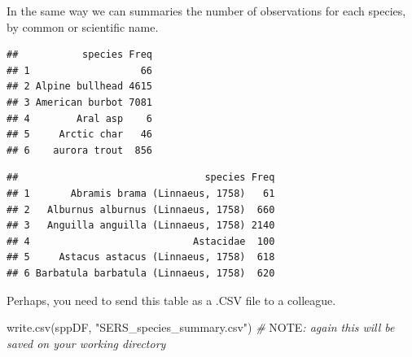 \documentclass[
  10pt,
]{article}
\newenvironment{Shaded}{\begin{snugshade}}{\end{snugshade}}
\newcommand{\AlertTok}[1]{\textcolor[rgb]{0.94,0.16,0.16}{#1}}
\newcommand{\CommentTok}[1]{\textcolor[rgb]{0.56,0.35,0.01}{\textit{#1}}}
\newcommand{\DecValTok}[1]{\textcolor[rgb]{0.00,0.00,0.81}{#1}}
\newcommand{\FunctionTok}[1]{\textcolor[rgb]{0.00,0.00,0.00}{#1}}
\newcommand{\NormalTok}[1]{#1}
\newcommand{\OtherTok}[1]{\textcolor[rgb]{0.56,0.35,0.01}{#1}}
\newcommand{\SpecialCharTok}[1]{\textcolor[rgb]{0.00,0.00,0.00}{#1}}
\newcommand{\StringTok}[1]{\textcolor[rgb]{0.31,0.60,0.02}{#1}}
\begin{document}
In the same way we can summaries the number of observations for each species, by common or scientific name.

\begin{Shaded}
\end{Shaded}

\begin{verbatim}
##           species Freq
## 1                   66
## 2 Alpine bullhead 4615
## 3 American burbot 7081
## 4        Aral asp    6
## 5     Arctic char   46
## 6    aurora trout  856
\end{verbatim}

\begin{Shaded}
\end{Shaded}

\begin{verbatim}
##                                species Freq
## 1       Abramis brama (Linnaeus, 1758)   61
## 2   Alburnus alburnus (Linnaeus, 1758)  660
## 3   Anguilla anguilla (Linnaeus, 1758) 2140
## 4                            Astacidae  100
## 5     Astacus astacus (Linnaeus, 1758)  618
## 6 Barbatula barbatula (Linnaeus, 1758)  620
\end{verbatim}

Perhaps, you need to send this table as a .CSV file to a colleague.

\begin{Shaded}
\begin{Highlighting}[]
\FunctionTok{write.csv}\NormalTok{(sppDF, }\StringTok{"SERS\_species\_summary.csv"}\NormalTok{)}
\CommentTok{\# }\AlertTok{NOTE}\CommentTok{: again this will be saved on your working directory}
\end{Highlighting}
\end{Shaded}
\end{document}
